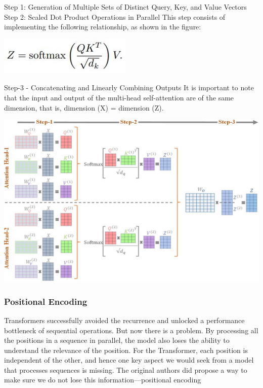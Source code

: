 \documentclass{article}
\begin{document}
Step 1: Generation of Multiple Sets of Distinct Query, Key, and Value Vectors
Step 2: Scaled Dot Product Operations in Parallel
This step consists of implementing the following relationship, as shown in the figure:

\begin{center}
    \includegraphics[width=.5\textwidth]{Picture6.jpg}
\end{center}

Step-3 - Concatenating and Linearly Combining Outputs
	It is important to note that the input and output of the multi-head self-attention are of the same dimension, that is, dimension (X) = dimension (Z).

\begin{center}
    \includegraphics[width=1\textwidth]{Picture5.jpg}
\end{center}

\subsubsection{Positional Encoding}
Transformers successfully avoided the recurrence and unlocked a performance bottleneck of sequential operations.
But now there is a problem. By processing all the positions in a sequence in parallel, the model also loses the ability to 
understand the relevance of the position. For the Transformer, each position is independent of the other, and hence one key 
aspect we would seek from a model that processes sequences is missing. The original authors did propose a way to make sure we 
do not lose this information—positional encoding
\end{document}
